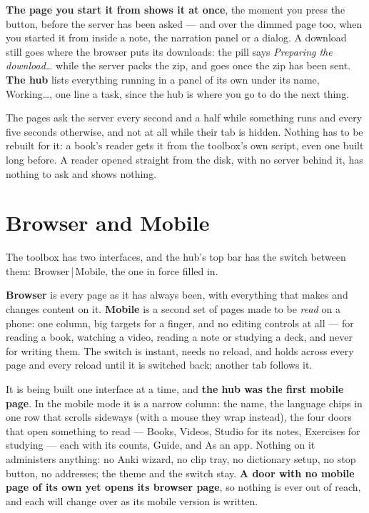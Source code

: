 \documentclass[11pt,oneside]{report}
\newcommand{\menu}[1]{\textsf{#1}}
\begin{document}
\textbf{The page you start it from shows it at once}, the moment you press
the button, before the server has been asked --- and over the dimmed page
too, when you started it from inside a note, the narration panel or a
dialog. A download still goes where the browser puts its downloads: the pill
says \emph{Preparing the download\ldots} while the server packs the zip, and
goes once the zip has been sent. \textbf{The hub} lists everything running
in a panel of its own under its name, \menu{Working\ldots}, one line a task,
since the hub is where you go to do the next thing.

The pages ask the server every second and a half while something runs and
every five seconds otherwise, and not at all while their tab is hidden.
Nothing has to be rebuilt for it: a book's reader gets it from the toolbox's
own script, even one built long before. A reader opened straight from the
disk, with no server behind it, has nothing to ask and shows nothing.

\section{Browser and Mobile}
\label{sec:mobile}

The toolbox has two interfaces, and the hub's top bar has the switch between
them: \menu{Browser}\,|\,\menu{Mobile}, the one in force filled in.

\textbf{Browser} is every page as it has always been, with everything that
makes and changes content on it. \textbf{Mobile} is a second set of pages
made to be \emph{read} on a phone: one column, big targets for a finger, and
no editing controls at all --- for reading a book, watching a video, reading
a note or studying a deck, and never for writing them. The switch is
instant, needs no reload, and holds across every page and every reload until
it is switched back; another tab follows it.

It is being built one interface at a time, and \textbf{the hub was the
first mobile page}. In the mobile mode it is a narrow column: the name, the
language chips in one row that scrolls sideways (with a mouse they wrap
instead), the four doors that open something to read --- \menu{Books},
\menu{Videos}, \menu{Studio} for its notes, \menu{Exercises} for studying ---
each with its counts, \menu{Guide}, and \menu{As an app}. Nothing on it administers anything:
no Anki wizard, no clip tray, no dictionary setup, no stop button, no
addresses; the theme and the switch stay. \textbf{A door with no mobile page
of its own yet opens its browser page}, so nothing is ever out of reach, and
each will change over as its mobile version is written.
\end{document}

